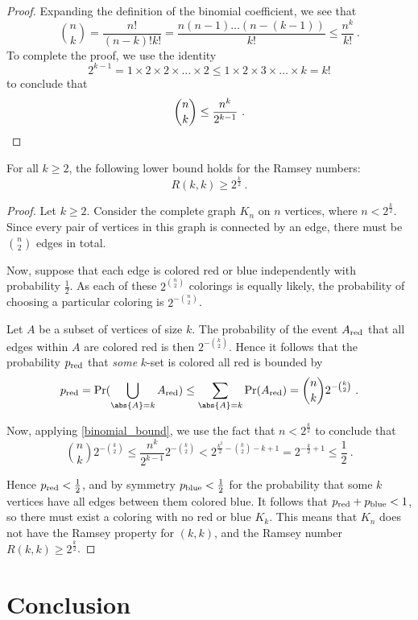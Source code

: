 \documentclass{article}
\begin{document}
\begin{proof}
    Expanding the definition of the binomial coefficient, we see that
    \[
        {n \choose k}
        = \frac{n!}{(n-k)!k!}
        = \frac{n(n-1)\ldots(n-(k-1))}{k!}
        \leq \frac{n^k}{k!} \ .
    \]
    To complete the proof, we use the identity
    \[
        2^{k-1}
        = 1 \times 2 \times 2 \times \ldots \times 2
        \leq 1 \times 2 \times 3 \times \ldots \times k
        = k!
    \]
    to conclude that
    \[
        {n \choose k} \leq \frac{n^k}{2^{k-1}} \ . \qedhere
    \]
\end{proof}

\begin{Theorem}
    For all $k \geq 2$, the following lower bound holds for the Ramsey numbers:
    \[ R(k,k) \geq 2^{\frac k 2} \ . \]
\end{Theorem}

\begin{proof}
    Let $k \geq 2$. Consider the complete graph $K_n$ on $n$ vertices, where $n < 2^{\frac k 2}$. Since every pair of vertices in this graph is connected by an edge, there must be $n \choose 2$ edges in total.

    Now, suppose that each edge is colored red or blue independently with probability $\frac 1 2$. As each of these $2^{n \choose 2}$ colorings is equally likely, the probability of choosing a particular coloring is $2^{-{n \choose 2}}$.

    Let $A$ be a subset of vertices of size $k$. The probability of the event $A_{\mathrm{red}}$ that all edges within $A$ are colored red is then $2^{-{k \choose 2}}$. Hence it follows that the probability $p_{\mathrm{red}}$ that \emph{some} $k$-set is colored all red is bounded by
    \[
        p_\red = \Pr(\bigcup_{\abs{A} = k} A_\red)
        \leq \sum_{\abs{A} = k} \Pr(A_\red)
        = {n \choose k} 2^{-{k \choose 2}} \ .
    \]

Now, applying \cref{binomial_bound}, we use the fact that $n < 2^{\frac k 2}$ to conclude that
    \[
        {n \choose k} 2^{-{k \choose 2}}
        \leq \frac{n^k}{2^{k-1}} 2^{-{k \choose 2}}
        < 2^{\frac{k^2}{2} - {k \choose 2} - k + 1}
        = 2^{-\frac k 2 + 1}
        \leq \frac 1 2 \ .
    \]

Hence $p_{\mathrm{red}} < \frac 1 2$, and by symmetry $p_{\mathrm{blue}} < \frac 1 2$ for the probability that some $k$ vertices have all edges between them colored blue. It follows that $p_{\mathrm{red}} + p_{\mathrm{blue}} < 1$, so there must exist a coloring with no red or blue $K_k$. This means that $K_n$ does not have the Ramsey property for $(k, k)$, and the Ramsey number $R(k,k) \geq 2^{\frac k 2}$.
\end{proof}

\section{Conclusion}


\listoftodos



\end{document}
